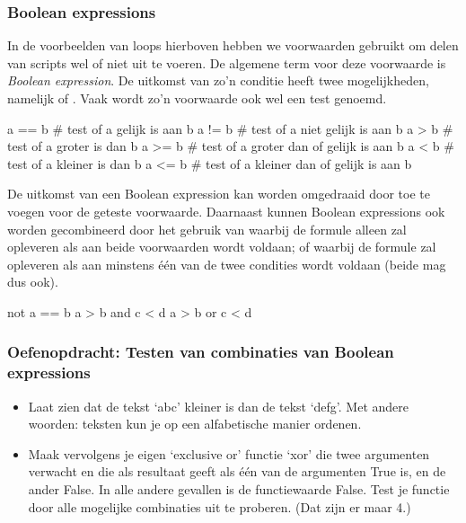 \documentclass[a4paper,11pt, fleqn]{article}
\begin{document}
\subsubsection{Boolean expressions}
In de voorbeelden van loops hierboven hebben we voorwaarden gebruikt om delen van scripts wel of niet uit te voeren. De algemene term voor deze voorwaarde is \textit{Boolean expression}. De uitkomst van zo'n conditie heeft twee mogelijkheden, namelijk  of . Vaak wordt zo'n voorwaarde ook wel een test genoemd.

\begin{python}
a == b	# test of a gelijk is aan b
a != b	# test of a niet gelijk is aan b
a > b	# test of a groter is dan b
a >= b	# test of a groter dan of gelijk is aan b
a < b	# test of a kleiner is dan b
a <= b	# test of a kleiner dan of gelijk is aan b
\end{python}

De uitkomst van een Boolean expression kan worden omgedraaid door  toe te voegen voor de geteste voorwaarde. Daarnaast kunnen Boolean expressions ook worden gecombineerd door het gebruik van  waarbij de formule alleen   zal opleveren als aan beide voorwaarden wordt voldaan; of  waarbij de formule  zal opleveren als aan minstens \'e\'en van de twee condities wordt voldaan (beide mag dus ook).

\begin{python}
not a == b
a > b and c < d
a > b or c < d
\end{python}

\subsubsection*{Oefenopdracht: Testen van combinaties van Boolean expressions} 
\begin{itemize}
\item Laat zien dat de tekst `abc' kleiner is dan de tekst `defg'.
Met andere woorden: teksten kun je op een alfabetische manier ordenen.
\item Maak vervolgens je eigen `exclusive or' functie `xor' die twee argumenten verwacht en die als resultaat  geeft als \'e\'en van de argumenten True is, en de ander False. In alle andere gevallen is de functiewaarde False. Test je functie door alle mogelijke combinaties uit te proberen. (Dat zijn er maar 4.)
\end{itemize}
\end{document}
